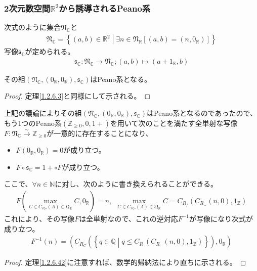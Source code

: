 \documentclass[dvipdfmx]{jsarticle}
\begin{document}
\subsubsection{2次元数空間$\mathbb{R}^{2}$から誘導されるPeano系}%
\begin{dfn}
次式のように集合$\mathfrak{N}_{\mathbb{C}}$と
\begin{align*}
\mathfrak{N}_{\mathbb{C}} = \left\{ (a,b) \in \mathbb{R}^{2} \middle| \exists n \in \mathfrak{N}_{\mathbb{R}}\left[ (a,b) = \left( n,0_{\mathbb{R}} \right) \right] \right\}
\end{align*}
写像$\mathfrak{s}_{\mathbb{C}}$が定められる。
\begin{align*}
\mathfrak{s}_{\mathbb{C}}:\mathfrak{N}_{\mathbb{C}} \rightarrow \mathfrak{N}_{\mathbb{C}};(a,b) \mapsto \left( a + 1_{\mathbb{R}},b \right)
\end{align*}
\end{dfn}
\begin{thm}\label{1.2.6.42}
その組$\left( \mathfrak{N}_{\mathbb{C}},\left( 0_{\mathbb{R}},0_{\mathbb{R}} \right),\mathfrak{s}_{\mathbb{C}} \right)$はPeano系となる。
\end{thm}
\begin{proof}
定理\ref{1.2.6.3}と同様にして示される。
\end{proof}
\begin{thm}\label{1.2.6.43}
上記の議論によりその組$\left( \mathfrak{N}_{\mathbb{C}},\left( 0_{\mathbb{R}},0_{\mathbb{R}} \right),\mathfrak{s}_{\mathbb{C}} \right)$はPeano系となるのであったので、もう1つのPeano系$\left( \mathbb{Z}_{\geq 0},0,1 + \right)$を用いて次のことを満たす全単射な写像$F:\mathfrak{N}_{\mathbb{C}}\overset{\sim}{\rightarrow}\mathbb{Z}_{\geq 0}$が一意的に存在することになり、
\begin{itemize}
\item
  $F\left( 0_{\mathbb{R}},0_{\mathbb{R}} \right) = 0$が成り立つ。
\item
  $F \circ \mathfrak{s}_{\mathbb{C}} = 1 + \circ F$が成り立つ。
\end{itemize}
ここで、$\forall n \in \mathbb{N}$に対し、次のように書き換えられることができる。
\begin{align*}
F\left( \max_{C \in C_{R_{C}}(A) \in \mathfrak{Q}_{\mathbb{R}}}C,0_{\mathbb{R}} \right) = n,\ \ \max_{C \in C_{R_{C}}(A) \in \mathfrak{Q}_{\mathbb{R}}}C = C_{R_{/}}\left( C_{R_{-}}(n,0),1_{\mathbb{Z}} \right)
\end{align*}
これにより、その写像$F$は全単射なので、これの逆対応$F^{- 1}$が写像になり次式が成り立つ。
\begin{align*}
F^{- 1}(n) = \left( C_{R_{C}}\left( \left\{ q \in \mathbb{Q} \middle| q \leq C_{R_{\frac{}{}}}\left( C_{R_{-}}(n,0),1_{\mathbb{Z}} \right) \right\} \right),0_{\mathbb{R}} \right)
\end{align*}
\end{thm}
\begin{proof}
定理\ref{1.2.6.42}に注意すれば、数学的帰納法により直ちに示される。
\end{proof}
\end{document}
